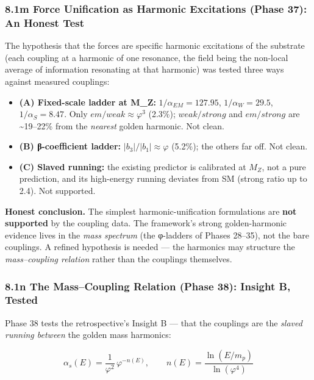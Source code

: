 \documentclass[
]{article}
\providecommand{\tightlist}{%
  \setlength{\itemsep}{0pt}\setlength{\parskip}{0pt}}
\begin{document}
\subsubsection{8.1m Force Unification as Harmonic Excitations (Phase
37): An Honest
Test}\label{m-force-unification-as-harmonic-excitations-phase-37-an-honest-test}

The hypothesis that the forces are specific harmonic excitations of the
substrate (each coupling at a harmonic of one resonance, the field being
the non-local average of information resonating at that harmonic) was
tested three ways against measured couplings:

\begin{itemize}
\tightlist
\item
  \textbf{(A) Fixed-scale ladder at M\_Z:} \(1/\alpha_{EM} = 127.95\),
  \(1/\alpha_W = 29.5\), \(1/\alpha_S = 8.47\). Only
  \(em/weak \approx \varphi^3\) (2.3\%); \(weak/strong\) and
  \(em/strong\) are \textasciitilde19--22\% from the \emph{nearest}
  golden harmonic. Not clean.
\item
  \textbf{(B) β-coefficient ladder:} \(|b_3|/|b_1| \approx \varphi\)
  (5.2\%); the others far off. Not clean.
\item
  \textbf{(C) Slaved running:} the existing predictor is calibrated at
  \(M_Z\), not a pure prediction, and its high-energy running deviates
  from SM (strong ratio up to 2.4). Not supported.
\end{itemize}

\textbf{Honest conclusion.} The simplest harmonic-unification
formulations are \textbf{not supported} by the coupling data. The
framework's strong golden-harmonic evidence lives in the \emph{mass
spectrum} (the φ-ladders of Phases 28--35), not the bare couplings. A
refined hypothesis is needed --- the harmonics may structure the
\emph{mass--coupling relation} rather than the couplings themselves.

\subsubsection{8.1n The Mass--Coupling Relation (Phase 38): Insight B,
Tested}\label{n-the-masscoupling-relation-phase-38-insight-b-tested}

Phase 38 tests the retrospective's Insight B --- that the couplings are
the \emph{slaved running between} the golden mass harmonics:

\[\alpha_s(E) = \frac{1}{\varphi^2}\,\varphi^{-n(E)}, \qquad n(E) = \frac{\ln(E/m_p)}{\ln(\varphi^4)}\]
\end{document}

